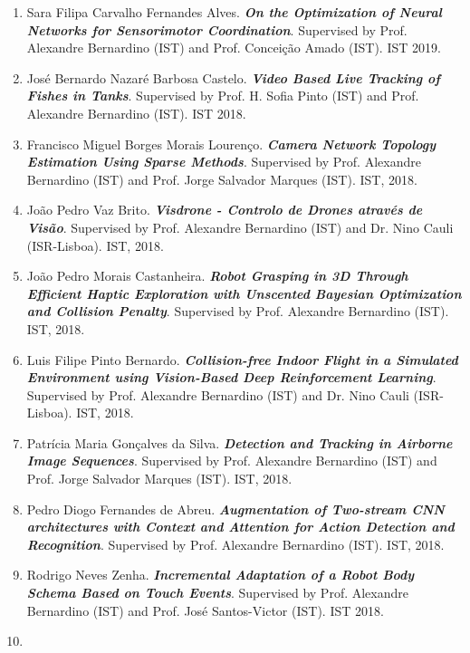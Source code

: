 \documentclass[
]{article}
\begin{document}
\begin{enumerate}
  Rui Eduardo Marques Cardoso. \emph{\textbf{Feedback control of
  saccades on a model of a 3D biomimetic robot eye}}. Supervised by
  Prof. Alexandre Bernardino (IST) and Prof. John van Opstal (Radboud
  Univ., Nijmegen, Netherlands). IST 2019.
\item
  Sara Filipa Carvalho Fernandes Alves. \emph{\textbf{On the
  Optimization of Neural Networks for Sensorimotor Coordination}}.
  Supervised by Prof. Alexandre Bernardino (IST) and Prof. Conceição
  Amado (IST). IST 2019.
\item
  José Bernardo Nazaré Barbosa Castelo. \emph{\textbf{Video Based Live
  Tracking of Fishes in Tanks}}. Supervised by Prof. H. Sofia Pinto
  (IST) and Prof. Alexandre Bernardino (IST). IST 2018.
\item
  Francisco Miguel Borges Morais Lourenço. \emph{\textbf{Camera Network
  Topology Estimation Using Sparse Methods}}. Supervised by Prof.
  Alexandre Bernardino (IST) and Prof. Jorge Salvador Marques (IST).
  IST, 2018.
\item
  João Pedro Vaz Brito. \emph{\textbf{Visdrone - Controlo de Drones
  através de Visão}}. Supervised by Prof. Alexandre Bernardino (IST) and
  Dr. Nino Cauli (ISR-Lisboa). IST, 2018.
\item
  João Pedro Morais Castanheira. \emph{\textbf{Robot Grasping in 3D
  Through Efficient Haptic Exploration with Unscented Bayesian
  Optimization and Collision Penalty}}. Supervised by Prof. Alexandre
  Bernardino (IST). IST, 2018.
\item
  Luis Filipe Pinto Bernardo. \emph{\textbf{Collision-free Indoor Flight
  in a Simulated Environment using Vision-Based Deep Reinforcement
  Learning}}. Supervised by Prof. Alexandre Bernardino (IST) and Dr.
  Nino Cauli (ISR-Lisboa). IST, 2018.
\item
  Patrícia Maria Gonçalves da Silva. \emph{\textbf{Detection and
  Tracking in Airborne Image Sequences}}. Supervised by Prof. Alexandre
  Bernardino (IST) and Prof. Jorge Salvador Marques (IST). IST, 2018.
\item
  Pedro Diogo Fernandes de Abreu. \emph{\textbf{Augmentation of
  Two-stream CNN architectures with Context and Attention for Action
  Detection and Recognition}}. Supervised by Prof. Alexandre Bernardino
  (IST). IST, 2018.
\item
  Rodrigo Neves Zenha. \emph{\textbf{Incremental Adaptation of a Robot
  Body Schema Based on Touch Events}}. Supervised by Prof. Alexandre
  Bernardino (IST) and Prof. José Santos-Victor (IST). IST 2018.
\item

\end{enumerate}
\end{document}
